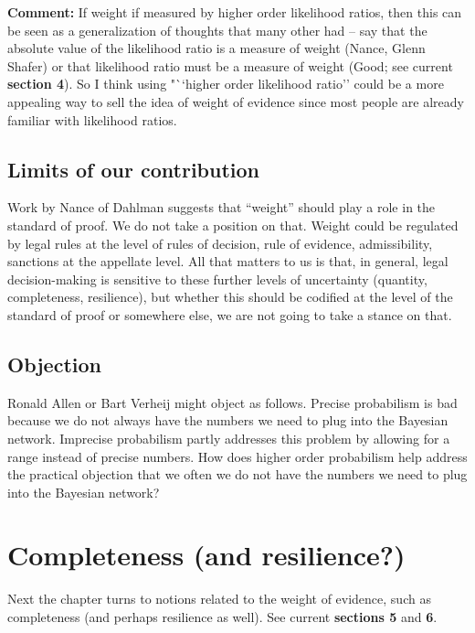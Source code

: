 \documentclass[
  10pt,
  dvipsnames,enabledeprecatedfontcommands]{scrartcl}
\begin{document}
\textbf{Comment:} If weight if measured by higher order likelihood
ratios, then this can be seen as a generalization of thoughts that many
other had -- say that the absolute value of the likelihood ratio is a
measure of weight (Nance, Glenn Shafer) or that likelihood ratio must be
a measure of weight (Good; see current \textbf{section 4}). So I think
using "``higher order likelihood ratio'' could be a more appealing way
to sell the idea of weight of evidence since most people are already
familiar with likelihood ratios.

\hypertarget{limits-of-our-contribution}{%
\subsection{Limits of our
contribution}\label{limits-of-our-contribution}}

Work by Nance of Dahlman suggests that ``weight'' should play a role in
the standard of proof. We do not take a position on that. Weight could
be regulated by legal rules at the level of rules of decision, rule of
evidence, admissibility, sanctions at the appellate level. All that
matters to us is that, in general, legal decision-making is sensitive to
these further levels of uncertainty (quantity, completeness,
resilience), but whether this should be codified at the level of the
standard of proof or somewhere else, we are not going to take a stance
on that.

\hypertarget{objection}{%
\subsection{Objection}\label{objection}}

Ronald Allen or Bart Verheij might object as follows. Precise
probabilism is bad because we do not always have the numbers we need to
plug into the Bayesian network. Imprecise probabilism partly addresses
this problem by allowing for a range instead of precise numbers. How
does higher order probabilism help address the practical objection that
we often we do not have the numbers we need to plug into the Bayesian
network?

\hypertarget{completeness-and-resilience}{%
\section{Completeness (and
resilience?)}\label{completeness-and-resilience}}

Next the chapter turns to notions related to the weight of evidence,
such as completeness (and perhaps resilience as well). See current
\textbf{sections 5} and \textbf{6}.
\end{document}
